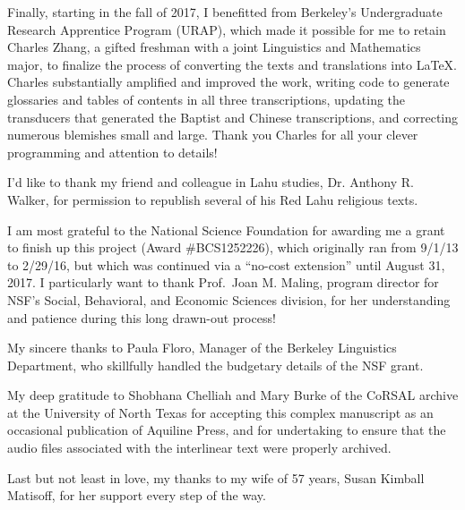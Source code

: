 Finally, starting in the fall of 2017, I benefitted from Berkeley's
Undergraduate Research Apprentice Program (URAP), which made it possible
for me to retain Charles Zhang, a gifted freshman with a joint Linguistics
and Mathematics major, to finalize the process of converting the
texts and translations into LaTeX. Charles substantially amplified and improved the work,
writing code to generate glossaries and tables of contents in all three transcriptions,
updating the transducers that generated the Baptist and Chinese transcriptions, and correcting
numerous blemishes small and large. Thank you Charles for all your clever programming
and attention to details!

I'd like to thank my friend and colleague in Lahu studies, Dr. Anthony
R. Walker, for permission to republish several of his Red Lahu religious
texts.

I am most grateful to the National Science Foundation for awarding me
a grant to finish up this project (Award \#BCS1252226), which
originally ran from 9/1/13 to 2/29/16, but which was continued via a
``no-cost extension'' until August 31, 2017. I particularly want to
thank Prof.\ Joan M. Maling, program director for NSF's Social,
Behavioral, and Economic Sciences division, for her understanding and
patience during this long drawn-out process!

My sincere thanks to Paula Floro, Manager of the Berkeley Linguistics
Department, who skillfully handled the budgetary details of the NSF
grant.

My deep gratitude to Shobhana Chelliah and Mary Burke of the CoRSAL archive at
the University of North Texas
for accepting this complex manuscript as an occasional publication of
Aquiline Press, and for undertaking to ensure that the audio files associated
with the interlinear text were properly archived.

Last but not least in love, my thanks to my wife of 57 years, Susan
Kimball Matisoff, for her support every step of the way.